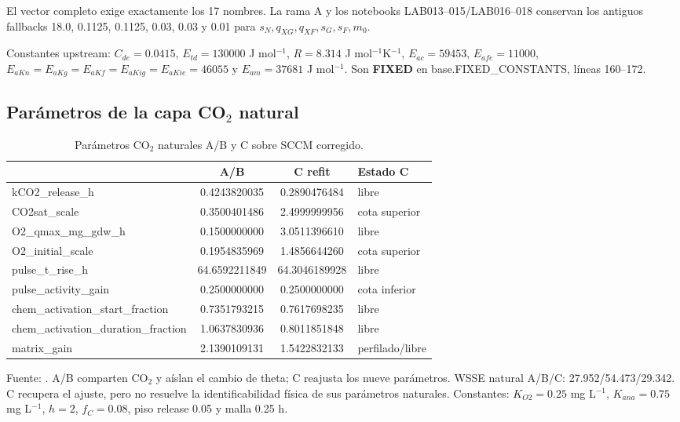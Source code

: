 \documentclass[11pt]{article}
\newcommand{\E}[1]{%
  \nobreak\hspace{0.16em}%
  \begingroup
  \setlength{\fboxsep}{1.5pt}%
  \colorbox{auditpale}{\textcolor{auditblue}{\sffamily\bfseries\scriptsize #1}}%
  \endgroup\hspace{0.16em}%
}
\newcommand{\code}[1]{{\small\ttfamily #1}}
\newcommand{\tablehead}[1]{\textcolor{auditblue}{\sffamily\bfseries #1}}
\begin{document}
El vector completo exige exactamente los 17 nombres. La rama A y los notebooks
LAB013--015/LAB016--018 conservan los antiguos fallbacks 18.0, 0.1125, 0.1125,
0.03, 0.03 y 0.01 para $s_N,q_{XG},q_{XF},s_G,s_F,m_0$.

Constantes upstream: $C_{de}=0.0415$, $E_{td}=130000$ J mol$^{-1}$,
$R=8.314$ J mol$^{-1}$K$^{-1}$, $E_{ac}=59453$, $E_{afe}=11000$,
$E_{aKn}=E_{aKg}=E_{aKf}=E_{aKig}=E_{aKie}=46055$ y $E_{am}=37681$
J mol$^{-1}$. Son \E{FIXED} en \code{base.FIXED\_CONSTANTS}, líneas 160--172.

\subsection{Parámetros de la capa CO$_2$ natural}

\begin{table}[H]
\centering
\caption{Parámetros CO$_2$ naturales A/B y C sobre SCCM corregido.}
\label{tab:parametros-co2-natural}
\small
{}
\begin{tabularx}{\textwidth}{>{\ttfamily\raggedright\arraybackslash}X
  S[table-format=2.10]
  S[table-format=2.10]
  >{\raggedright\arraybackslash}p{0.20\textwidth}}
\toprule
\multicolumn{1}{l}{\tablehead{Nombre en código}} &
{\tablehead{A/B}} & {\tablehead{C refit}} & \tablehead{Estado C} \\
\midrule
kCO2\_release\_h & 0.4243820035 & 0.2890476484 & libre \\
CO2sat\_scale & 0.3500401486 & 2.4999999956 & cota superior \\
O2\_qmax\_mg\_gdw\_h & 0.1500000000 & 3.0511396610 & libre \\
O2\_initial\_scale & 0.1954835969 & 1.4856644260 & cota superior \\
pulse\_t\_rise\_h & 64.6592211849 & 64.3046189928 & libre \\
pulse\_activity\_gain & 0.2500000000 & 0.2500000000 & cota inferior \\
chem\_activation\_start\_fraction & 0.7351793215 & 0.7617698235 & libre \\
chem\_activation\_duration\_fraction & 1.0637830936 & 0.8011851848 & libre \\
matrix\_gain & 2.1390109131 & 1.5422832133 & perfilado/libre \\
\bottomrule
\end{tabularx}
\end{table}

Fuente: .
A/B comparten CO$_2$ y aíslan el cambio de theta; C reajusta los nueve parámetros.
WSSE natural A/B/C: 27.952/54.473/29.342. C recupera el ajuste, pero no resuelve
la identificabilidad física de sus parámetros naturales.
Constantes: $K_{O2}=0.25$ mg L$^{-1}$, $K_{ana}=0.75$ mg L$^{-1}$,
$h=2$, $f_C=0.08$, piso release 0.05 y malla 0.25 h.
\end{document}
